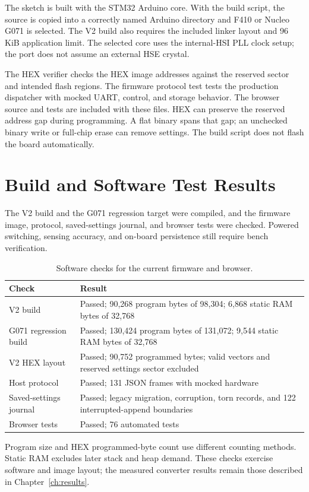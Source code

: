 The sketch is built with the STM32 Arduino core. With the build script, the source is copied into a correctly named Arduino directory and F410 or Nucleo G071 is selected. The V2 build also requires the included linker layout and 96 KiB application limit. The selected core uses the internal-HSI PLL clock setup; the port does not assume an external HSE crystal.

The HEX verifier checks the HEX image addresses against the reserved sector and intended flash regions. The firmware protocol test tests the production dispatcher with mocked UART, control, and storage behavior. The browser source and tests are included with these files. HEX can preserve the reserved address gap during programming. A flat binary spans that gap; an unchecked binary write or full-chip erase can remove settings. The build script does not flash the board automatically.

\section{Build and Software Test Results}
\label{sec:app-fw-verification}

The V2 build and the G071 regression target were compiled, and the firmware image, protocol, saved-settings journal, and browser tests were checked. Powered switching, sensing accuracy, and on-board persistence still require bench verification.

\begin{table}[htbp]
\centering
\small
\caption{Software checks for the current firmware and browser.}
\label{tab:app-fw-software-checks}
\begin{tabularx}{\textwidth}{@{}L{0.25\textwidth}Y@{}}
\toprule Check & Result\\\midrule
V2 build & Passed; 90,268 program bytes of 98,304; 6,868 static RAM bytes of 32,768\\
G071 regression build & Passed; 130,424 program bytes of 131,072; 9,544 static RAM bytes of 32,768\\
V2 HEX layout & Passed; 90,752 programmed bytes; valid vectors and reserved settings sector excluded\\
Host protocol & Passed; 131 JSON frames with mocked hardware\\
Saved-settings journal & Passed; legacy migration, corruption, torn records, and 122 interrupted-append boundaries\\
Browser tests & Passed; 76 automated tests\\
\bottomrule
\end{tabularx}
\end{table}

Program size and HEX programmed-byte count use different counting methods. Static RAM excludes later stack and heap demand. These checks exercise software and image layout; the measured converter results remain those described in Chapter~\ref{ch:results}.
